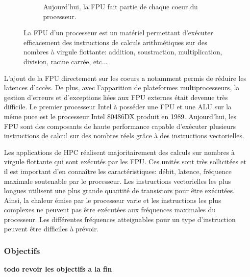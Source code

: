 \begin{figure}
\begin{subfigure}[b]{0.45\linewidth}
                \caption{Aujourd'hui, la FPU fait partie de chaque coeur du processeur.}
                \label{pic_cpu_fpu_recent}
            \end{subfigure}
            \caption{La FPU d'un processeur est un matériel permettant d'exécuter efficacement des instructions de calculs arithmétiques sur des nombres à virgule flottante: addition, soustraction, multiplication, division, racine carrée, etc...\protect\footnotemark }\label{fig:fpu_evo_before_after}
        \end{figure}
        
        L'ajout de la FPU directement sur les coeurs a notamment permis de réduire les latences d'accès. De plus, avec l'apparition de plateformes multiprocesseurs, la gestion d'erreurs et d'exceptions liées aux FPU externes était devenue très difficile. Le premier processeur Intel à posséder une FPU et une ALU sur la même puce est le processeur Intel 80486DX produit en 1989.  Aujourd'hui, les FPU sont des composants de haute performance capable d'exécuter plusieurs instructions de calcul sur des nombres réels grâce à des instructions vectorielles.  

        
        
        Les applications de HPC réalisent majoritairement des calculs sur nombres à virgule flottante qui sont exécutés par les FPU. Ces unités sont très sollicitées et il est important d'en connaître les caractéristiques: débit, latence, fréquence maximale soutenable par le processeur. Les instructions vectorielles les plus longues utilisent une plus grande quantité de transistors pour être exécutées. Ainsi, la chaleur émise par le processeur varie et les instructions les plus complexes ne peuvent pas être exécutées aux fréquences maximales du processeur. Les différentes fréquences atteignables pour un type d'instruction peuvent être difficiles à prévoir.
        
       
       
    \subsubsection{Objectifs}
    \textbf{todo revoir les objectifs a la fin}
    
